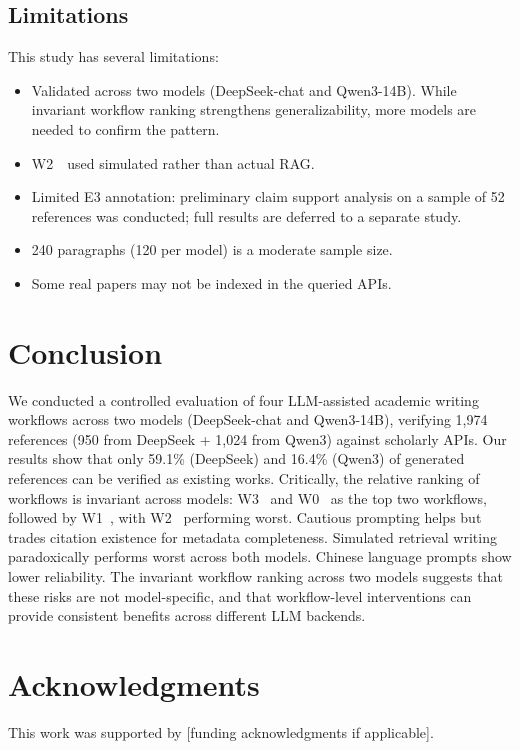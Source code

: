 \documentclass[11pt,a4paper]{article}
\newcommand{\wzero}{W0~}
\newcommand{\wone}{W1~}
\newcommand{\wtwo}{W2~}
\newcommand{\wthree}{W3~}
\begin{document}
\subsection{Limitations}

This study has several limitations:

\begin{itemize}[nosep]
    \item Validated across two models (DeepSeek-chat and Qwen3-14B). While invariant workflow ranking strengthens generalizability, more models are needed to confirm the pattern.
    \item \wtwo~used simulated rather than actual RAG.
    \item Limited E3 annotation: preliminary claim support analysis on a sample of 52 references was conducted; full results are deferred to a separate study.
    \item 240 paragraphs (120 per model) is a moderate sample size.
    \item Some real papers may not be indexed in the queried APIs.
\end{itemize}

\section{Conclusion}
\label{sec:conclusion}

We conducted a controlled evaluation of four LLM-assisted academic writing workflows across two models (DeepSeek-chat and Qwen3-14B), verifying 1,974 references (950 from DeepSeek + 1,024 from Qwen3) against scholarly APIs. Our results show that only 59.1\% (DeepSeek) and 16.4\% (Qwen3) of generated references can be verified as existing works. Critically, the relative ranking of workflows is invariant across models: \wthree{} and \wzero{} as the top two workflows, followed by \wone{}, with \wtwo{} performing worst. Cautious prompting helps but trades citation existence for metadata completeness. Simulated retrieval writing paradoxically performs worst across both models. Chinese language prompts show lower reliability. The invariant workflow ranking across two models suggests that these risks are not model-specific, and that workflow-level interventions can provide consistent benefits across different LLM backends.

\section*{Acknowledgments}
This work was supported by [funding acknowledgments if applicable].
\end{document}
